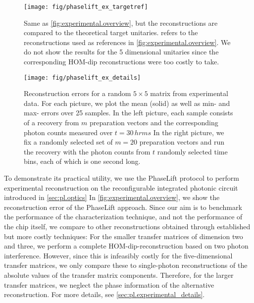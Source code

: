 \begin{figure*}[tbp]
  \centering
  \texttt{[image: fig/phaselift\_ex\_targetref]}
  \caption{%
     \label{fig:experimental.targetref}%
     Same as \cref{fig:experimental.overview}, but the reconstructions are compared to the theoretical target unitaries.
      refers to the reconstructions used as references in \cref{fig:experimental.overview}.
     We do not show the results for the 5 dimensional unitaries since the corresponding HOM-dip reconstructions were too costly to take.
  }
\end{figure*}
\begin{figure*}[tbp]
  \centering
  \texttt{[image: fig/phaselift\_ex\_details]}
  \caption{%
   \label{fig:experimental.details}%
   Reconstruction errors for a random $5 \times 5$ matrix from experimental data.
   For each picture, we plot the mean (solid) as well as min- and max- errors over 25 samples.
   In the left picture, each sample consists of a recovery from $m$ preparation vectors and the corresponding photon counts measured over $t = 30\,hrm{s}$
   In the right picture, we fix a randomly selected set of $m=20$ preparation vectors and run the recovery with the photon counts from $t$ randomly selected time bins, each of which is one second long.
  }
\end{figure*}

To demonstrate its practical utility, we use the PhaseLift protocol to perform experimental reconstruction on the reconfigurable integrated photonic circuit introduced in \cref{sec:pl.optics}
In \cref{fig:experimental.overview}, we show the reconstruction error of the PhaseLift approach.
Since our aim is to benchmark the performance of the characterization technique, and not the performance of the chip itself, we compare to  other reconstructions obtained through established but more costly techniques:
For the smaller transfer matrices of dimension two and three, we perform a complete HOM-dip-reconstruction based on two photon interference.
However, since this is infeasibly costly for the five-dimensional transfer matrices, we only compare these to single-photon reconstructions of the absolute values of the transfer matrix components.
Therefore, for the larger transfer matrices, we neglect the phase information of the alternative reconstruction.
For more details, see \cref{sec:pl.experimental_details}.

